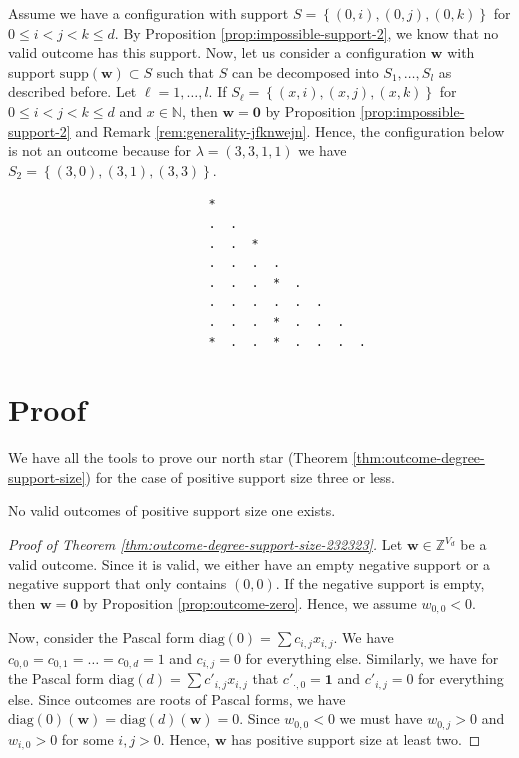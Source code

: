 \begin{example}
    Assume we have a configuration with support \( S = \left\{ (0,i), (0,j), (0,k) \right\} \) for \( 0 \leq i < j< k \leq d \). By Proposition \ref{prop:impossible-support-2}, we know that no valid outcome has this support. Now, let us consider a configuration \( \mathbf{w} \) with support \( \mathrm{supp}(\mathbf{w}) \subset S \) such that \( S \) can be decomposed into \( S_1, \dots, S_l \) as described before. Let \( \ell = 1, \dots, l \). If \( S_\ell = \left\{ (x,i), (x,j), (x,k) \right\} \) for \( 0 \leq i < j< k \leq d \) and \( x \in \mathbb{N} \), then \( \mathbf{w} = \mathbf 0 \) by Proposition \ref{prop:impossible-support-2} and Remark \ref{rem:generality-jfknwejn}. Hence, the configuration below is not an outcome because for \( \lambda = (3,3,1,1) \) we have \( S_2 = \left\{ (3,0), (3,1), (3,3) \right\} \).
    \begin{verbatim}
                            *
                            .  .
                            .  .  *  
                            .  .  .  .  
                            .  .  .  *  .  
                            .  .  .  .  .  .  
                            .  .  .  *  .  .  .  
                            *  .  .  *  .  .  .  .  
    \end{verbatim}
\end{example}

\section{Proof}

We have all the tools to prove our north star (Theorem \ref{thm:outcome-degree-support-size}) for the case of positive support size three or less.

\begin{theorem}\label{thm:outcome-degree-support-size-232323}
    No valid outcomes of positive support size one exists.
\end{theorem}


\begin{proof}[Proof of Theorem \ref{thm:outcome-degree-support-size-232323}]
    Let \( \mathbf{w} \in \mathbb{Z}^{V_d} \) be a valid outcome. Since it is valid, we either have an empty negative support or a negative support that only contains \( (0,0) \). If the negative support is empty, then \( \mathbf{w} = \mathbf 0 \) by Proposition \ref{prop:outcome-zero}. Hence, we assume \( w_{0,0} < 0 \).

    Now, consider the Pascal form \( \mathrm{diag}(0) = \sum c_{i,j} x_{i,j} \). We have \( c_{0, 0} = c_{0, 1} = \dots = c_{0, d} = 1 \) and \( c_{i,j} = 0 \) for everything else. Similarly, we have for the Pascal form \( \mathrm{diag}(d) = \sum c'_{i,j} x_{i,j} \) that \( c'_{\cdot, 0} = \mathbf 1 \) and \( c'_{i,j} = 0 \) for everything else. Since outcomes are roots of Pascal forms, we have \( \mathrm{diag}(0)(\mathbf w) = \mathrm{diag}(d)(\mathbf w) = 0 \).
    Since \( w_{0,0} < 0 \) we must have \( w_{0,j} > 0 \) and \( w_{i, 0} > 0 \) for some \( i,j > 0 \). Hence, \( \mathbf{w} \) has positive support size at least two.
\end{proof}


